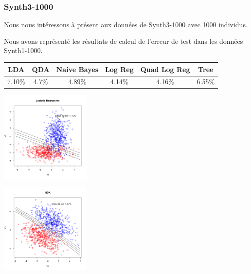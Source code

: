 \documentclass[10pt]{article}
\begin{document}
\subsubsection{Synth3-1000}
Nous nous intéressons à présent aux données de Synth3-1000 avec 1000 individus.

Nous avons représenté les résultats de calcul de l'erreur de test dans les données Synth1-1000. 
\begin{center}
	\begin{tabular}{|c | c | c| c| c| c|}
		\hline
		LDA & QDA & Naive Bayes & Log Reg & Quad Log Reg & Tree\\
		\hline	
		7.10\% & 4.7\% & 4.89\% & 4.14\% & 4.16\% &6.55\%
	\end{tabular}
\end{center}

\begin{minipage}{.5\textwidth}
	\includegraphics[width=45mm]{Figures/synth3_lda.png}
\end{minipage}%
\hspace{0.02\linewidth}
\begin{minipage}{.5\textwidth}
	\includegraphics[width=45mm]{Figures/synth3_qda.png}
\end{minipage}
\end{document}
